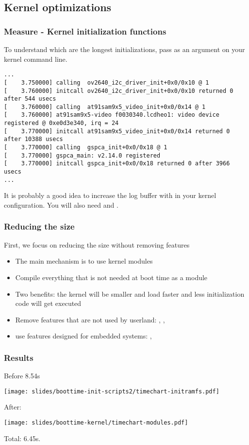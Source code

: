 \subsection{Kernel optimizations}

\begin{frame}[fragile]
\frametitle{Measure - Kernel initialization functions}
To understand which are the longest initializations, pass
 as an argument on your kernel command line.
\begin{block}{}
\tiny
\begin{verbatim}
...
[    3.750000] calling  ov2640_i2c_driver_init+0x0/0x10 @ 1
[    3.760000] initcall ov2640_i2c_driver_init+0x0/0x10 returned 0 after 544 usecs
[    3.760000] calling  at91sam9x5_video_init+0x0/0x14 @ 1
[    3.760000] at91sam9x5-video f0030340.lcdheo1: video device registered @ 0xe0d3e340, irq = 24
[    3.770000] initcall at91sam9x5_video_init+0x0/0x14 returned 0 after 10388 usecs
[    3.770000] calling  gspca_init+0x0/0x18 @ 1
[    3.770000] gspca_main: v2.14.0 registered
[    3.770000] initcall gspca_init+0x0/0x18 returned 0 after 3966 usecs
...
\end{verbatim}
\end{block}
It is probably a good idea to increase the log buffer with
 in your kernel configuration. You will
also need  and .
\end{frame}

\begin{frame}
\frametitle{Reducing the size}
First, we focus on reducing the size without removing features
\begin{itemize}
	\item The main mechanism is to use kernel modules
	\item Compile everything that is not needed at boot time as a
		module
	\item Two benefits: the kernel will be smaller and load faster and
		less initialization code will get executed
	\item Remove features that are not used by userland:
		, ,
	\item use features designed for embedded systems:
		, 
\end{itemize}
\end{frame}

\begin{frame}
\frametitle{Results}
Before 8.54s
\begin{center}
    \texttt{[image: slides/boottime-init-scripts2/timechart-initramfs.pdf]}
\end{center}
After:
\begin{center}
    \texttt{[image: slides/boottime-kernel/timechart-modules.pdf]}
\end{center}
Total: 6.45s.
\end{frame}

